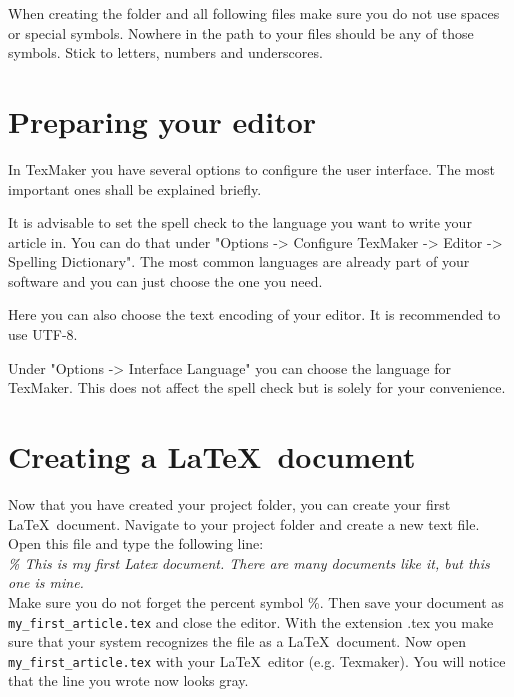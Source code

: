 \documentclass[]{tufte-book} %
\begin{document}
When creating the folder and all following files make sure you do not use spaces or special symbols. Nowhere in the path to your files should be any of those symbols. Stick to letters, numbers and underscores. 


\section{Preparing your editor}

In TexMaker you have several options to configure the user interface. The most important ones shall be explained briefly. 

It is advisable to set the spell check to the language you want to write your article in. You can do that under "Options -> Configure TexMaker -> Editor -> Spelling Dictionary". The most common languages are already part of your software and you can just choose the one you need.  

Here you can also choose the text encoding of your editor. It is recommended to use UTF-8.

Under "Options -> Interface Language" you can choose the language for TexMaker. This does not affect the spell check but is solely for your convenience.  


\section{Creating a \LaTeX\ document}

Now that you have created your project folder, you can create your first \LaTeX\ document. Navigate to your project folder and create a new text file. Open this file and type the following line:\\[5pt]

\emph{\% This is my first Latex document. There are many documents like it, but this one is mine.}\\[5pt]

Make sure you do not forget the percent symbol \%. Then save your document as \verb!my_first_article.tex! and close the editor. With the extension .tex you make sure that your system recognizes the file as a \LaTeX\ document.
Now open \verb!my_first_article.tex! with your \LaTeX\ editor (e.g. Texmaker). You will notice that the line you wrote now looks gray.\\[5pt]
\end{document}
